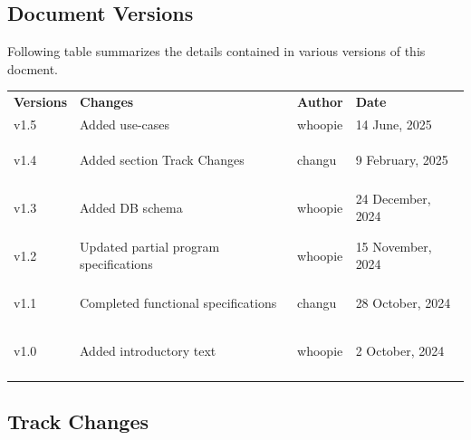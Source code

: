 \documentclass{article}%
\begin{document}
\subsection{Document Versions}%

%
Following table summarizes the details contained in various versions of this docment.%
\par%
\vspace{0.5\baselineskip}%
\begin{longtable}[c]{llll}%
\arrayrulecolor{cornflowerblue}%
\hline%
\rowcolor{babyblueeyes!60}%

\small{\color{darkblue}%
\textsf{\textbf{Versions}}}&
\small{\color{darkblue}%
\textsf{\textbf{Changes}}}&
\small{\color{darkblue}%
\textsf{\textbf{Author}}}&
\small{\color{darkblue}%
\textsf{\textbf{Date}}}\\%
\arrayrulecolor{cornflowerblue}%
\hline%
\hypertarget{ID:1239024947}{}%
\hypertarget{ID:1783872964}{}%
\hypertarget{ID:1027468099}{}%
\hypertarget{ID:1278135825}{}%
\small{v1.5}&\small{Added use{-}cases}&\small{whoopie}&\small{14 June, 2025}\\%
\hypertarget{ID:1288999912}{}%
\hypertarget{ID:1822004348}{}%
\hypertarget{ID:390398480}{}%
\hypertarget{ID:411753166}{}%
\small{v1.4}&\small{Added section Track Changes}&\small{changu}&\small{9 February, 2025}\\%
\hypertarget{ID:1827306491}{}%
\hypertarget{ID:647318253}{}%
\hypertarget{ID:1389367568}{}%
\hypertarget{ID:917512200}{}%
\small{v1.3}&\small{Added DB schema}&\small{whoopie}&\small{24 December, 2024}\\%
\hypertarget{ID:1918080192}{}%
\hypertarget{ID:1626570634}{}%
\hypertarget{ID:1657260568}{}%
\hypertarget{ID:396374720}{}%
\small{v1.2}&\small{Updated partial program specifications}&\small{whoopie}&\small{15 November, 2024}\\%
\hypertarget{ID:1498227768}{}%
\hypertarget{ID:412008954}{}%
\hypertarget{ID:384298059}{}%
\hypertarget{ID:529241957}{}%
\small{v1.1}&\small{Completed functional specifications}&\small{changu}&\small{28 October, 2024}\\%
\hypertarget{ID:35074242}{}%
\hypertarget{ID:1399755129}{}%
\hypertarget{ID:828269092}{}%
\hypertarget{ID:129158486}{}%
\small{v1.0}&\small{Added introductory text}&\small{whoopie}&\small{2 October, 2024}\\%
\arrayrulecolor{cornflowerblue}%
\hline%
\end{longtable}%
\subsection{Track Changes}%
\end{document}
